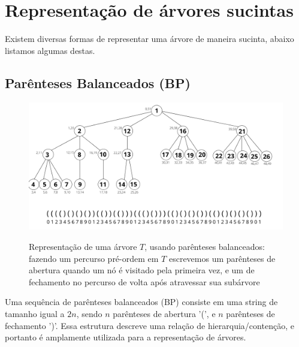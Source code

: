 \section{Representação de árvores sucintas}
Existem diversas formas de representar  uma árvore de maneira sucinta, abaixo listamos algumas destas.

\subsection{Parênteses Balanceados (BP)}\label{sec:sec-parenthesis-balanceados}
\begin{figure}[!ht]
\centering
  \caption[Representação de árvores com parênteses balanceados]{Representação de uma árvore $T$, usando parênteses balanceados: fazendo um percurso pré-ordem em $T$ escrevemos um parênteses de abertura quando um nó é visitado pela primeira vez, e um de fechamento no percurso de volta após atravessar  sua subárvore \citep{paper-succint-representation-of-balanced-parentheses}}
  \includegraphics[width=\columnwidth]{images/arvore_geral.png}
  \label{fig:parenthesis-representation}
\end{figure}
Uma sequência de parênteses balanceados (BP) consiste em uma string de tamanho igual a $2n$, sendo $n$ parênteses de abertura '(', e $n$ parênteses de fechamento ')'. Essa estrutura descreve uma relação de hierarquia/contenção, e portanto é amplamente utilizada para a representação de árvores.

